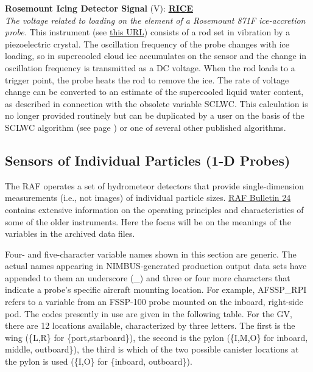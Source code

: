 \begin{hangparagraphs}
\textbf{Rosemount Icing Detector Signal} (V):\hypertarget{RICE}{}\textbf{
}\textbf{\uline{RICE}}\\
\emph{The voltage related to loading on the element of a Rosemount
871F ice-accretion probe.} This
instrument (see \href{http://www.eol.ucar.edu/instruments/rosemount-icing-probe}{this URL})
consists of a rod set in vibration by a piezoelectric crystal. The
oscillation frequency of the probe changes with ice loading, so in
supercooled cloud ice accumulates on the sensor and the change in
oscillation frequency is transmitted as a DC voltage. When the rod
loads to a trigger point, the probe heats the rod to remove the ice.
The rate of voltage change can be converted to an estimate of the
supercooled liquid water content,
as described in connection with the obsolete variable SCLWC. This
calculation is no longer provided routinely but can be duplicated
by a user on the basis of the SCLWC algorithm (see page \pageref{SCLWC})
or one of several other published algorithms.
\end{hangparagraphs}


\subsection{Sensors of Individual Particles (1-D Probes)\label{subsec:1DProbes}}

The RAF operates a set of hydrometeor detectors
that provide single-dimension measurements (i.e., not images) of individual
particle sizes. \href{http://www.eol.ucar.edu/raf/Bulletins/bulletin24.html}{RAF Bulletin 24}
contains extensive information on the operating principles and characteristics
of some of the older instruments. Here the focus will be on the meanings
of the variables in the archived data files.\label{punch:5-2}

\label{VariableNames1DProbes}Four- and five-character variable names
shown in this section are generic. The actual names appearing in NIMBUS-generated
production output data sets have appended to them an underscore (\_)
and three or four more characters that indicate a probe's specific
aircraft mounting location. For example, AFSSP\_RPI refers to a variable
from an FSSP-100 probe mounted on the inboard, right-side pod. The
codes presently in use are given in the following table. For the GV,
there are 12 locations available, characterized by three letters.
The first is the wing (\{L,R\} for \{port,starboard\}), the second
is the pylon (\{I,M,O\} for inboard, middle, outboard\}), the third
is which of the two possible canister locations at the pylon is used
(\{I,O\} for \{inboard, outboard\}).

